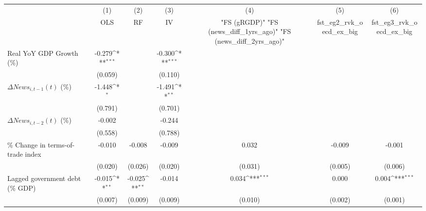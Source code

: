 {
\def\sym#1{\ifmmode^{#1}\else\(^{#1}\)\fi}
\begin{tabular}{l*{6}{c}}
\toprule
                    &\multicolumn{1}{c}{(1)}&\multicolumn{1}{c}{(2)}&\multicolumn{1}{c}{(3)}&\multicolumn{1}{c}{(4)}&\multicolumn{1}{c}{(5)}&\multicolumn{1}{c}{(6)}\\
                    &\multicolumn{1}{c}{OLS}&\multicolumn{1}{c}{RF}&\multicolumn{1}{c}{IV}&\multicolumn{1}{c}{ "FS (gRGDP)"  "FS (news_diff_1yrs_ago)"  "FS (news_diff_2yrs_ago)" }&\multicolumn{1}{c}{fst_eg2_rvk_oecd_ex_big}&\multicolumn{1}{c}{fst_eg3_rvk_oecd_ex_big}\\
\midrule
Real YoY GDP Growth (\%)&      -0.279\sym{***}&                     &      -0.300\sym{***}&                     &                     &                     \\
                    &     (0.059)         &                     &     (0.110)         &                     &                     &                     \\
\addlinespace
$ \Delta News_{i,t-1}(t)$ (\%)&      -1.448\sym{*}  &                     &      -1.491\sym{**} &                     &                     &                     \\
                    &     (0.791)         &                     &     (0.701)         &                     &                     &                     \\
\addlinespace
$ \Delta News_{i,t-2}(t)$ (\%)&      -0.002         &                     &      -0.244         &                     &                     &                     \\
                    &     (0.558)         &                     &     (0.788)         &                     &                     &                     \\
\addlinespace
\% Change in terms-of-trade index&      -0.010         &      -0.008         &      -0.009         &       0.032         &      -0.009         &      -0.001         \\
                    &     (0.020)         &     (0.026)         &     (0.020)         &     (0.031)         &     (0.005)         &     (0.006)         \\
\addlinespace
Lagged government debt (\% GDP)&      -0.015\sym{**} &      -0.025\sym{**} &      -0.014         &       0.034\sym{***}&       0.000         &       0.004\sym{***}\\
                    &     (0.007)         &     (0.009)         &     (0.009)         &     (0.010)         &     (0.002)         &     (0.001)         \\

\end{tabular}}
